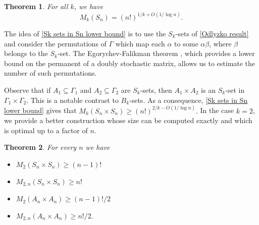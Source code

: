\documentclass[12pt]{article}
\newtheorem{thm}{Theorem}
\begin{document}

\begin{thm} \label{Sk sets in Sn lower bound} For all $k$, we have
$$M_k(S_n)=(n!)^{1/k+O(1/\log n)}.$$
\end{thm}

The idea of \autoref{Sk sets in Sn lower bound} is to use the $S_k$-sets of \autoref{Odlyzko result} and consider the permutations of $\Gamma$ which map each $\alpha$ to some $\alpha\beta$, where $\beta$ belongs to the $S_k$-set. The Egorychev-Falikman theorem \cite{egorychev,falikman}, which provides a lower bound on the permanent of a doubly stochastic matrix, allows us to estimate the number of such permutations. 

Observe that if $A_1\subseteq\Gamma_1$ and $A_2\subseteq\Gamma_2$ are $S_k$-sets, then $A_1\times A_2$ is an $S_k$-set in $\Gamma_1\times\Gamma_2$. This is a notable contrast to $B_k$-sets. As a consequence, \autoref{Sk sets in Sn lower bound} gives that $M_k(S_n\times S_n)\ge(n!)^{2/k-O(1/\log n)}.$ In the case $k=2$, we provide a better construction whose size can be computed exactly and which is optimal up to a factor of $n$.

\begin{thm} \label{Sn times Sn result}
    For every $n$ we have
    \begin{itemize}
        \item[(a)] $M_2(S_n\times S_n)\ge(n-1)!$
        \item[(b)] $M_{2,n}(S_n\times S_n)\ge n!$
        \item[(c)] $M_2(A_n\times A_n)\ge(n-1)!/2$
        \item[(d)] $M_{2,n}(A_n\times A_n)\ge n!/2.$
    \end{itemize}
\end{thm}
\end{document}
